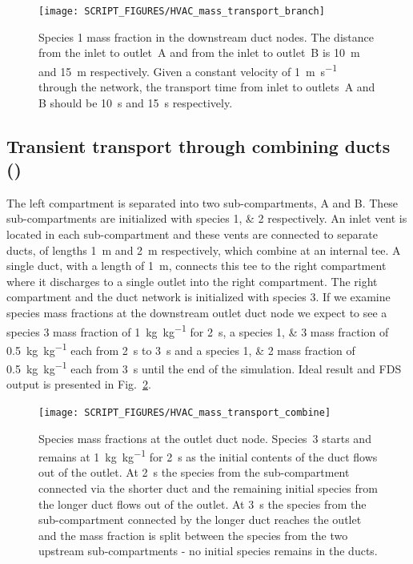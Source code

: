 \documentclass[11pt]{book}
\begin{document}
\begin{figure}[ht]
\centering
\texttt{[image: SCRIPT\_FIGURES/HVAC\_mass\_transport\_branch]}
\caption[ test case.]{Species \num{1} mass fraction in the downstream duct nodes. The distance from the inlet to outlet~A and from the inlet to outlet~B is \SI{10}{\meter} and \SI{15}{\meter} respectively. Given a constant velocity of \SI[per-mode=symbol]{1}{\meter\per\second} through the network, the transport time from inlet to outlets~A and B should be \SI{10}{\second} and \SI{15}{\second} respectively.}
\label{fig_HVAC_mass_transport_branch}
\end{figure}

\subsection{Transient transport through combining ducts (\texorpdfstring{}{HVAC\_mass\_transport\_combine})}
\label{HVAC_mass_transport_combine}
The left compartment is separated into two sub-compartments, A and B. These sub-compartments are initialized with species \numlist{1;2} respectively. An inlet vent is located in each sub-compartment and these vents are connected to separate ducts, of lengths \SI{1}{\meter} and \SI{2}{\meter} respectively, which combine at an internal tee. A single duct, with a length of \SI{1}{\meter}, connects this tee to the right compartment where it discharges to a single outlet into the right compartment. The right compartment and the duct network is initialized with species \num{3}. If we examine species mass fractions at the downstream outlet duct node we expect to see a species \num{3} mass fraction of \SI[per-mode=symbol]{1}{\kilogram\per\kilogram} for \SI{2}{\second}, a species \numlist{1;3} mass fraction of \SI[per-mode=symbol]{0.5}{\kilogram\per\kilogram} each from \SI{2}{\second} to \SI{3}{\second} and a species \numlist{1;2} mass fraction of \SI[per-mode=symbol]{0.5}{\kilogram\per\kilogram} each from \SI{3}{\second} until the end of the simulation. Ideal result and FDS output is presented in Fig.~\ref{fig_HVAC_mass_transport_combine}.

\begin{figure}[ht]
\centering
\texttt{[image: SCRIPT\_FIGURES/HVAC\_mass\_transport\_combine]}
\caption[ test case.]{Species mass fractions at the outlet duct node. Species~3 starts and remains at \SI[per-mode=symbol]{1}{\kilogram\per\kilogram} for \SI{2}{\second} as the initial contents of the duct flows out of the outlet. At \SI{2}{\second} the species from the sub-compartment connected via the shorter duct and the remaining initial species from the longer duct flows out of the outlet. At \SI{3}{\second} the species from the sub-compartment connected by the longer duct reaches the outlet and the mass fraction is split between the species from the two upstream sub-compartments - no initial species remains in the ducts.}
\label{fig_HVAC_mass_transport_combine}
\end{figure}
\end{document}
